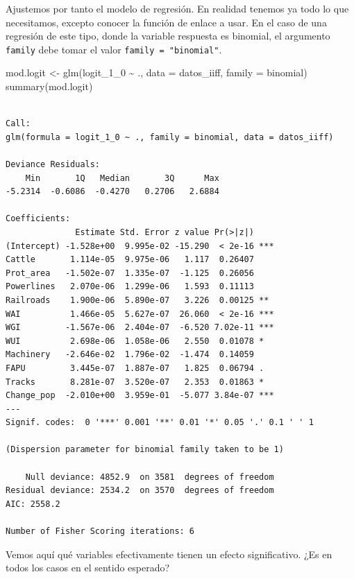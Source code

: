 \documentclass[
  letterpaper,
  DIV=11,
  numbers=noendperiod]{scrreprt}
\newenvironment{Shaded}{\begin{snugshade}}{\end{snugshade}}
\newcommand{\AttributeTok}[1]{\textcolor[rgb]{0.40,0.45,0.13}{#1}}
\newcommand{\FunctionTok}[1]{\textcolor[rgb]{0.28,0.35,0.67}{#1}}
\newcommand{\NormalTok}[1]{\textcolor[rgb]{0.00,0.23,0.31}{#1}}
\newcommand{\OtherTok}[1]{\textcolor[rgb]{0.00,0.23,0.31}{#1}}
\newcommand{\SpecialCharTok}[1]{\textcolor[rgb]{0.37,0.37,0.37}{#1}}
\begin{document}
Ajustemos por tanto el modelo de regresión. En realidad tenemos ya todo
lo que necesitamos, excepto conocer la función de enlace a usar. En el
caso de una regresión de este tipo, donde la variable respuesta es
binomial, el argumento \texttt{family} debe tomar el valor
\texttt{family\ =\ "binomial"}.

\begin{Shaded}
\begin{Highlighting}[]
\NormalTok{mod.logit }\OtherTok{\textless{}{-}} \FunctionTok{glm}\NormalTok{(logit\_1\_0 }\SpecialCharTok{\textasciitilde{}}\NormalTok{ ., }\AttributeTok{data =}\NormalTok{ datos\_iiff, }\AttributeTok{family =}\NormalTok{ binomial)}
\FunctionTok{summary}\NormalTok{(mod.logit)}
\end{Highlighting}
\end{Shaded}

\begin{verbatim}

Call:
glm(formula = logit_1_0 ~ ., family = binomial, data = datos_iiff)

Deviance Residuals: 
    Min       1Q   Median       3Q      Max  
-5.2314  -0.6086  -0.4270   0.2706   2.6884  

Coefficients:
              Estimate Std. Error z value Pr(>|z|)    
(Intercept) -1.528e+00  9.995e-02 -15.290  < 2e-16 ***
Cattle       1.114e-05  9.975e-06   1.117  0.26407    
Prot_area   -1.502e-07  1.335e-07  -1.125  0.26056    
Powerlines   2.070e-06  1.299e-06   1.593  0.11113    
Railroads    1.900e-06  5.890e-07   3.226  0.00125 ** 
WAI          1.466e-05  5.627e-07  26.060  < 2e-16 ***
WGI         -1.567e-06  2.404e-07  -6.520 7.02e-11 ***
WUI          2.698e-06  1.058e-06   2.550  0.01078 *  
Machinery   -2.646e-02  1.796e-02  -1.474  0.14059    
FAPU         3.445e-07  1.887e-07   1.825  0.06794 .  
Tracks       8.281e-07  3.520e-07   2.353  0.01863 *  
Change_pop  -2.010e+00  3.959e-01  -5.077 3.84e-07 ***
---
Signif. codes:  0 '***' 0.001 '**' 0.01 '*' 0.05 '.' 0.1 ' ' 1

(Dispersion parameter for binomial family taken to be 1)

    Null deviance: 4852.9  on 3581  degrees of freedom
Residual deviance: 2534.2  on 3570  degrees of freedom
AIC: 2558.2

Number of Fisher Scoring iterations: 6
\end{verbatim}

Vemos aquí qué variables efectivamente tienen un efecto significativo.
¿Es en todos los casos en el sentido esperado?
\end{document}
